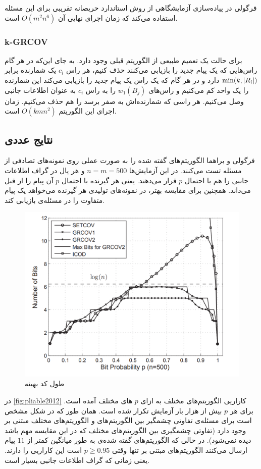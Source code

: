  فرگولی در پیاده‌سازی آزمایشگاهی از روش استاندارد حریصانه تقریبی برای این مسئله استفاده می‌کند که زمان اجرای نهایی آن
 $O(m^2 n^6)$
 است.
\subsubsection{k-GRCOV}
برای حالت
\picodt
یک تعمیم طبیعی از الگوریتم قبلی وجود دارد. به جای این‌که در هر گام راس‌هایی که یک پیام جدید را بازیابی می‌کنند حذف کنیم، هر راس 
$c_i$
یک شمارنده برابر
$\min(k, \left|{R_i}\right|)$
دارد و در هر گام که یک راس یک پیام جدید را بازیابی می‌کند این شمارنده را یک واحد کم می‌کنیم و راس‌های
$w_1(B_j)$
را به راس
$c_i$
به عنوان اطلاعات جانبی وصل می‌کنیم. هر راسی که شمارنده‌اش به صفر برسد را هم حذف می‌کنیم. زمان اجرای این الگوریتم
$O(kmn^2)$
است.

\subsection{
نتایج عددی
}
فرگولی و براهما الگوریتم‌های گفته شده را به صورت عملی روی نمونه‌های تصادفی از مسئله تست می‌کنند. در این آزمایش‌ها 
$n = m = 500$
و هر یال در گراف اطلاعات جانبی را هم با احتمال
$p$
قرار می‌دهند. یعنی هر گیرنده با احتمال
$p$
آن پیام را از قبل می‌داند. همچنین برای مقایسه بهتر، در نمونه‌های تولیدی هر گیرنده می‌خواهد یک پیام متفاوت را در مسئله‌ی
\icod
بازیابی کند.
\begin{figure}
	\centering
	\includegraphics[width=0.7\linewidth]{figs/ch3/pliable2012}
	\caption[
	طول کد بهینه
	]{طول کد بهینه\cite{pliablefirstpaper}}
	\label{fig:pliable2012}
\end{figure}

در 
\autoref{fig:pliable2012}
کاراریی الگوریتم‌های مختلف به ازای 
$p$
های مختلف آمده است. برای هر
$p$
بیش از هزار بار آزمایش تکرار شده است. همان طور که در شکل مشخص است برای مسئله‌ی \picod تفاوتی چشمگیر بین الگوریتم‌های
\picod
و الگوریتم‌های مختلف مبتنی بر
\icod
وجود دارد (تفاوتی چشمگیری بین الگوریتم‌های مختلف
\icod
که در این مقایسه مهم باشد دیده نمی‌شود). در حالی که الگوریتم‌های گفته شده‌ی
\picod
به طور میانگین کمتر از
$11$
پیام ارسال می‌کنند الگوریتم‌های مبتنی بر
\icod
تنها وقتی
$p \geq 0.95$
است این کاراریی را دارند. یعنی زمانی که گراف اطلاعات جانبی بسیار  است.

